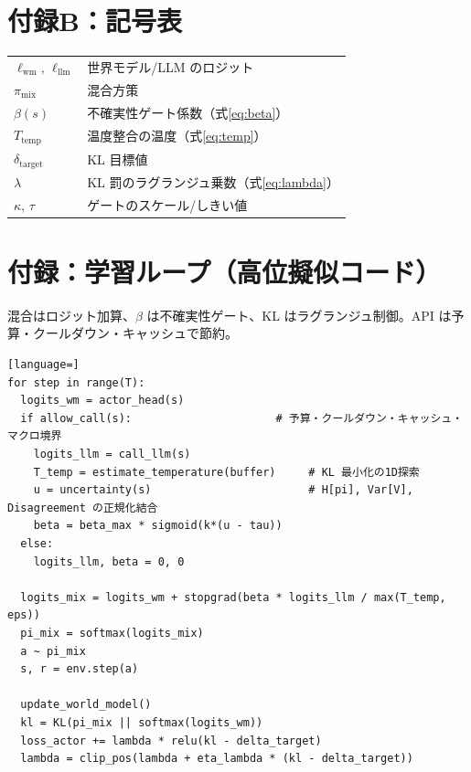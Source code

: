 \documentclass[a4paper,12pt]{article}
\begin{document}
\section*{付録B：記号表}
\begin{tabular}{ll}
$\ell_{\mathrm{wm}},\,\ell_{\mathrm{llm}}$ & 世界モデル/LLM のロジット\\
$\pi_{\mathrm{mix}}$ & 混合方策\\
$\beta(s)$ & 不確実性ゲート係数（式\eqref{eq:beta}）\\
$T_{\mathrm{temp}}$ & 温度整合の温度（式\eqref{eq:temp}）\\
$\delta_{\mathrm{target}}$ & KL 目標値\\
$\lambda$ & KL 罰のラグランジュ乗数（式\eqref{eq:lambda}）\\
$\kappa,\,\tau$ & ゲートのスケール/しきい値\\
\end{tabular}

\section*{付録：学習ループ（高位擬似コード）}
混合はロジット加算、$\beta$ は不確実性ゲート、KL はラグランジュ制御。API は予算・クールダウン・キャッシュで節約。
\begin{lstlisting}[language=]
for step in range(T):
  logits_wm = actor_head(s)
  if allow_call(s):                      # 予算・クールダウン・キャッシュ・マクロ境界
    logits_llm = call_llm(s)
    T_temp = estimate_temperature(buffer)     # KL 最小化の1D探索
    u = uncertainty(s)                        # H[pi], Var[V], Disagreement の正規化結合
    beta = beta_max * sigmoid(k*(u - tau))
  else:
    logits_llm, beta = 0, 0

  logits_mix = logits_wm + stopgrad(beta * logits_llm / max(T_temp, eps))
  pi_mix = softmax(logits_mix)
  a ~ pi_mix
  s, r = env.step(a)

  update_world_model()
  kl = KL(pi_mix || softmax(logits_wm))
  loss_actor += lambda * relu(kl - delta_target)
  lambda = clip_pos(lambda + eta_lambda * (kl - delta_target))
\end{lstlisting}

\renewcommand{\refname}{参考文献}
\begingroup
\small

\endgroup
\end{document}
